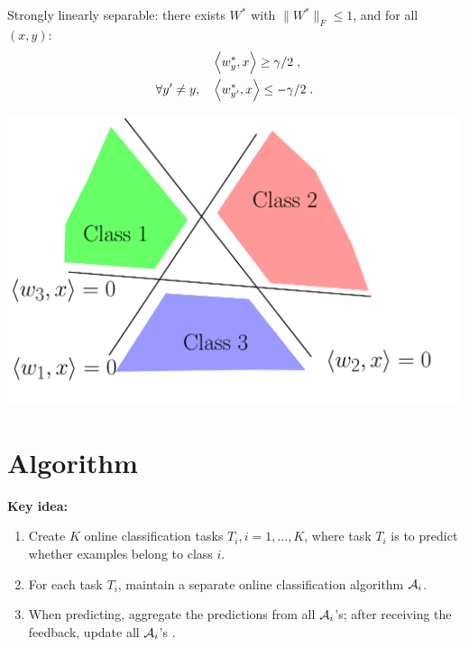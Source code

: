\documentclass[landscape,a0a,final]{a0poster}
\begin{document}
\begin{multicols}{3}
\begin{minipage}{0.65\linewidth}
Strongly linearly separable: there exists $W^*$ with $\| W^* \|_F \leq 1$, and for all $(x, y)$:
\begin{align*}
& \left\langle w^*_{y}, x \right\rangle \ge \gamma/2 \; , \\
\forall y' \neq y, \quad & \left\langle w^*_{y'}, x \right\rangle \le - \gamma/2 \; .
\end{align*}
\end{minipage}
\begin{minipage}{0.35\linewidth}
\includegraphics[width=\linewidth]{figures/ova_sep.pdf}
\end{minipage}



\section*{Algorithm}

\textbf{Key idea:}
\begin{enumerate}
\item Create $K$ online classification tasks $T_i, i = 1,\ldots,K$, where task $T_i$ is to predict whether examples belong to class $i$.
\item For each task $T_i$, maintain a separate online classification algorithm $\mathcal{A}_i$.
\item When predicting, aggregate the predictions from all $\mathcal{A}_i$'s; after receiving the feedback, update all $\mathcal{A}_i$'s .
\end{enumerate}


\end{multicols}
\end{document}
